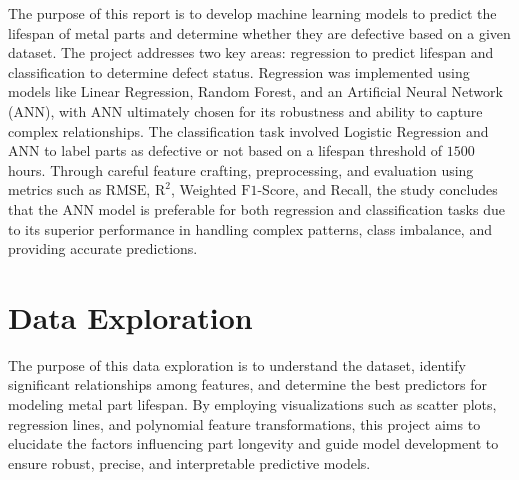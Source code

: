 \documentclass{article}
\begin{document}
The purpose of this report is to develop machine learning models to predict the lifespan of metal parts and determine whether they are defective based on a given dataset. The project addresses two key areas: regression to predict lifespan and classification to determine defect status. Regression was implemented using models like Linear Regression, Random Forest, and an Artificial Neural Network (ANN), with ANN ultimately chosen for its robustness and ability to capture complex relationships. The classification task involved Logistic Regression and ANN to label parts as defective or not based on a lifespan threshold of $1500$ hours. Through careful feature crafting, preprocessing, and evaluation using metrics such as $\text{RMSE}$, $\text{R}^2$, Weighted $\text{F1}$-Score, and Recall, the study concludes that the ANN model is preferable for both regression and classification tasks due to its superior performance in handling complex patterns, class imbalance, and providing accurate predictions.

\section{Data Exploration}



The purpose of this data exploration is to understand the dataset, identify significant relationships among features, and determine the best predictors for modeling metal part lifespan. By employing visualizations such as scatter plots, regression lines, and polynomial feature transformations, this project aims to elucidate the factors influencing part longevity and guide model development to ensure robust, precise, and interpretable predictive models.
\end{document}
